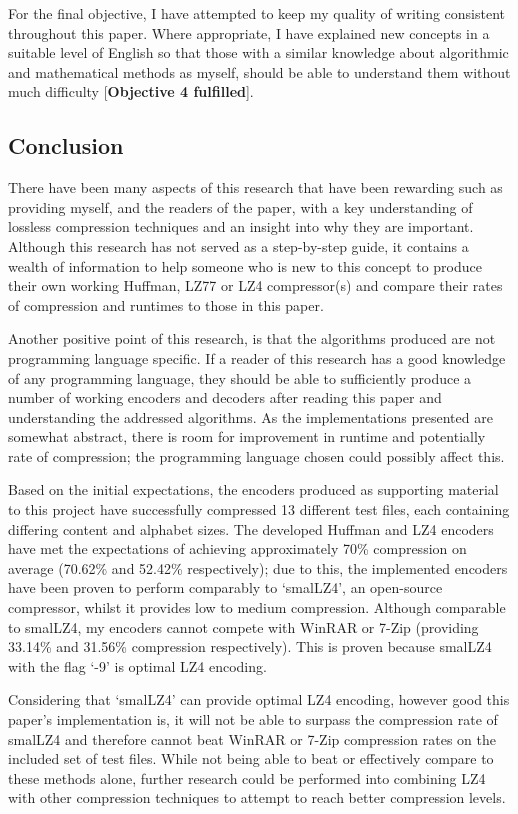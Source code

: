 \documentclass[12pt]{article}
\begin{document}
For the final objective, I have attempted to keep my quality of writing consistent throughout this paper. Where appropriate, I have explained new concepts in a suitable level of English so that those with a similar knowledge about algorithmic and mathematical methods as myself, should be able to understand them without much difficulty [\textbf{Objective 4 fulfilled}].

\subsection{Conclusion}
There have been many aspects of this research that have been rewarding such as providing myself, and the readers of the paper, with a key understanding of lossless compression techniques and an insight into why they are important. Although this research has not served as a step-by-step guide, it contains a wealth of information to help someone who is new to this concept to produce their own working Huffman, LZ77 or LZ4 compressor(s) and compare their rates of compression and runtimes to those in this paper.

Another positive point of this research, is that the algorithms produced are not programming language specific. If a reader of this research has a good knowledge of any programming language, they should be able to sufficiently produce a number of working encoders and decoders after reading this paper and understanding the addressed algorithms. As the implementations presented are somewhat abstract, there is room for improvement in runtime and potentially rate of compression; the programming language chosen could possibly affect this.

Based on the initial expectations, the encoders produced as supporting material to this project have successfully compressed 13 different test files, each containing differing content and alphabet sizes. The developed Huffman and LZ4 encoders have met the expectations of achieving approximately 70\% compression on average (70.62\% and 52.42\% respectively); due to this, the implemented encoders have been proven to perform comparably to `smalLZ4', an open-source compressor, whilst it provides low to medium compression. Although comparable to smalLZ4, my encoders cannot compete with WinRAR or 7-Zip (providing 33.14\% and 31.56\% compression respectively). This is proven because smalLZ4 with the flag `-9' is optimal LZ4 encoding. 

Considering that `smalLZ4' can provide optimal LZ4 encoding, however good this paper's implementation is, it will not be able to surpass the compression rate of smalLZ4 and therefore cannot beat WinRAR or 7-Zip compression rates on the included set of test files. While not being able to beat or effectively compare to these methods alone, further research could be performed into combining LZ4 with other compression techniques to attempt to reach better compression levels.
\end{document}
